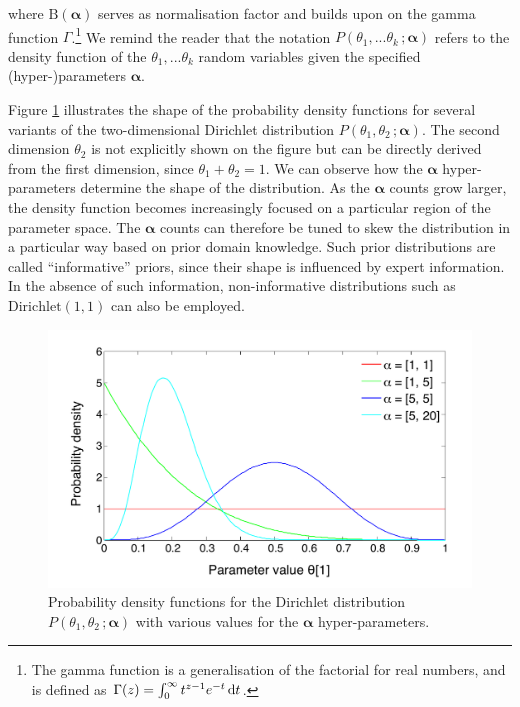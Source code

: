 where $ \mathrm{B}(\boldsymbol\alpha)$ serves as normalisation factor and builds upon on the gamma function $\Gamma$.\footnote{The gamma function is a generalisation of the factorial for real numbers, and is defined as $\Gamma(z) = \int_0^\infty  t^{z-1} e^{-t}\,{\rm d}t$.} 
We remind the reader that the notation $P(\theta_1,...\theta_k\,; \boldsymbol\alpha)$ refers to the density function of the $\theta_1,... \theta_k$ random variables given the specified (hyper-)parameters $\boldsymbol\alpha$. 

Figure \ref{fig:dirichletfun} illustrates the shape of the probability density functions for several variants of the two-dimensional Dirichlet distribution $P(\theta_1,\theta_2\,; \boldsymbol\alpha)$.  The second dimension $\theta_2$ is not explicitly shown on the figure but can be directly derived from the first dimension, since $\theta_1 + \theta_2=1$.  We can observe how the $\boldsymbol\alpha$ hyper-parameters determine the shape of the distribution. As the $\boldsymbol\alpha$ counts grow larger, the density function becomes increasingly focused on a particular region of the parameter space.  The $\boldsymbol\alpha$ counts can therefore be tuned to skew the distribution in a particular way based on prior domain knowledge. Such prior distributions are called ``informative'' priors, since their shape is influenced by expert information. In the absence of such information, non-informative distributions such as $\mathrm{Dirichlet}(1,1)$ can also be employed. 

\begin{figure}[h]
\centering
\includegraphics[scale=0.45]{imgs/dirichletfun.pdf}
\caption{Probability density functions for the Dirichlet distribution $P(\theta_1, \theta_2\,; \boldsymbol\alpha)$  with various values for the $\boldsymbol\alpha$ hyper-parameters.}
\label{fig:dirichletfun}
\end{figure}

